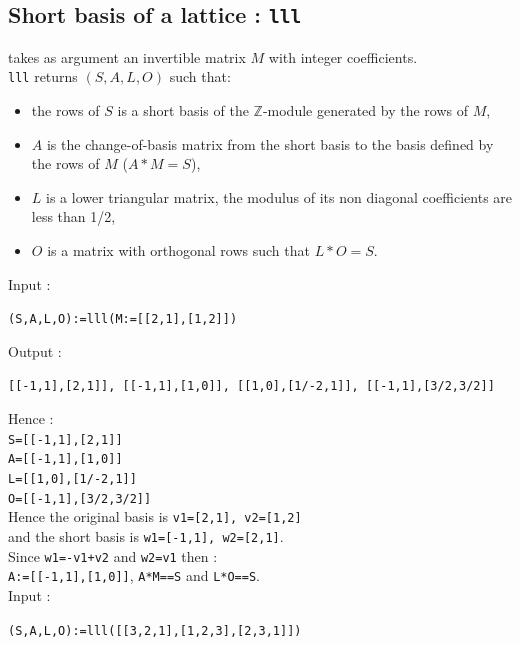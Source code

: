 \documentclass[a4paper,11pt]{book}
\begin{document}
\subsection{Short basis of a lattice : {\tt lll}}
 takes as argument an invertible matrix $M$ with
integer coefficients.\\
{\tt lll} returns $(S,A,L,O)$ such that:
\begin{itemize}
\item the rows of $S$ is a short basis of the $\mathbb Z$-module 
generated by the rows of $M$,
\item $A$ is the change-of-basis matrix from the short basis to the basis 
defined by the rows of $M$ ($A*M=S$),
\item $L$ is a lower triangular matrix, the modulus of its non diagonal
coefficients are less than 1/2,
\item $O$ is a matrix with orthogonal rows such that $L*O=S$.
\end{itemize}
Input :
\begin{center}{\tt (S,A,L,O):=lll(M:=[[2,1],[1,2]])}\end{center}
Output :
\begin{center}{\tt [[-1,1],[2,1]], [[-1,1],[1,0]], [[1,0],[1/-2,1]], [[-1,1],[3/2,3/2]]}\end{center}
Hence :\\
{\tt S=[[-1,1],[2,1]]}\\
{\tt A=[[-1,1],[1,0]]}\\
{\tt L=[[1,0],[1/-2,1]]}\\
{\tt O=[[-1,1],[3/2,3/2]]}\\
Hence the original basis is {\tt v1=[2,1], v2=[1,2]}\\
and the short basis is {\tt w1=[-1,1], w2=[2,1]}.\\
Since {\tt w1=-v1+v2} and {\tt w2=v1} then :\\
{\tt A:=[[-1,1],[1,0]]}, {\tt A*M==S} and {\tt L*O==S}.\\
Input :
\begin{center}{\tt (S,A,L,O):=lll([[3,2,1],[1,2,3],[2,3,1]])}\end{center}
\end{document}
